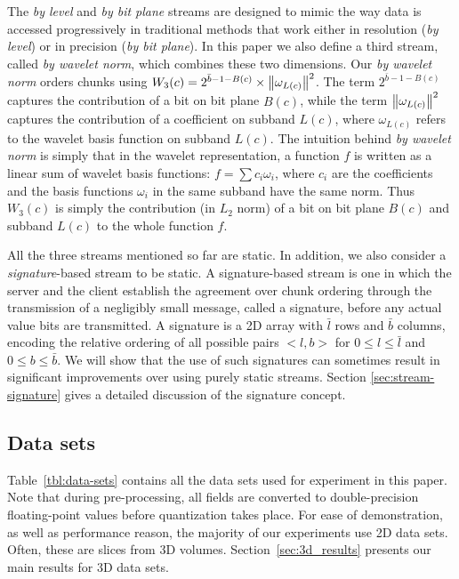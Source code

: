 The \emph{by level} and \emph{by bit plane} streams are designed to mimic the way data is accessed
progressively in traditional methods that work either in resolution (\emph{by level}) or in
precision (\emph{by bit plane}). In this paper we also define a third stream, called \emph{by
wavelet norm}, which combines these two dimensions. Our \emph{by wavelet norm} orders chunks using
$W_3(c)=2^{\bar{b}-1-B(c)}\times \left\lVert\omega_{L(c)}\right\rVert^2$. The term $2^{\bar{b}-1-B(c)}$ captures the
contribution of a bit on bit plane $B(c)$, while the term $\left\lVert\omega_{L(c)}\right\rVert^2$ captures the
contribution of a coefficient on subband $L(c)$, where $\omega_{L(c)}$ refers to the wavelet basis
function on subband $L(c)$. The intuition behind \emph{by wavelet norm} is simply that in the
wavelet representation, a function $f$ is written as a linear sum of wavelet basis functions:
$f=\sum{c_i\omega_i}$, where $c_i$ are the coefficients and the basis functions $\omega_i$ in the
same subband have the same norm. Thus $W_3(c)$ is simply the contribution (in $L_2$ norm) of a bit
on bit plane $B(c)$ and subband $L(c)$ to the whole function $f$.

All the three streams mentioned so far are static. In addition, we also consider a
\emph{signature}-based stream to be static. A signature-based stream is one in which the server and
the client establish the agreement over chunk ordering through the transmission of a negligibly
small message, called a signature, before any actual value bits are transmitted. A signature is a 2D
array with $\bar{l}$ rows and $\bar{b}$ columns, encoding the relative ordering of all possible
pairs $<l,b>$ for $0\leq l \leq \bar{l}$ and $0\leq b \leq \bar{b}$. We will show that the use of
such signatures can sometimes result in significant improvements over using purely static streams.
Section \ref{sec:stream-signature} gives a detailed discussion of the signature concept.

\subsection{Data sets}
\label{sec:data-sets}

Table~\ref{tbl:data-sets} contains all the data sets used for experiment in this paper. Note that
during pre-processing, all fields are converted to double-precision floating-point values before
quantization takes place. For ease of demonstration, as well as performance reason, the majority of
our experiments use 2D data sets. Often, these are slices from 3D volumes.
Section~\ref{sec:3d_results} presents our main results for 3D data sets.


